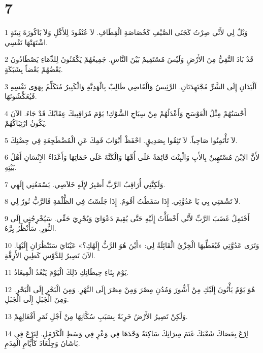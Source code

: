 \chapter{7}

\par 1 وَيْلٌ لِي لأَنِّي صِرْتُ كَجَنَى الصَّيْفِ كَخُصَاصَةِ الْقِطَافِ. لاَ عُنْقُودَ لِلأَكْلِ وَلاَ بَاكُورَةَ تِينَةٍ اشْتَهَتْهَا نَفْسِي.
\par 2 قَدْ بَادَ التَّقِيُّ مِنَ الأَرْضِ وَلَيْسَ مُسْتَقِيمٌ بَيْنَ النَّاسِ. جَمِيعُهُمْ يَكْمُنُونَ لِلدِّمَاءِ يَصْطَادُونَ بَعْضُهُمْ بَعْضاً بِشَبَكَةٍ.
\par 3 اَلْيَدَانِ إِلَى الشَّرِّ مُجْتَهِدَتَانِ. الرَّئِيسُ وَالْقَاضِي طَالِبٌ بِالْهَدِيَّةِ وَالْكَبِيرُ مُتَكَلِّمٌ بِهَوَى نَفْسِهِ فَيُعَكِّشُونَهَا.
\par 4 أَحْسَنُهُمْ مِثْلُ الْعَوْسَجِ وَأَعْدَلُهُمْ مِنْ سِيَاجِ الشَّوْكِ! يَوْمَ مُرَاقِبِيكَ عِقَابُكَ قَدْ جَاءَ. الآنَ يَكُونُ ارْتِبَاكُهُمْ.
\par 5 لاَ تَأْتَمِنُوا صَاحِباً. لاَ تَثِقُوا بِصَدِيقٍ. احْفَظْ أَبْوَابَ فَمِكَ عَنِ الْمُضْطَجِعَةِ فِي حِضْنِكَ.
\par 6 لأَنَّ الاِبْنَ مُسْتَهِينٌ بِالأَبِ وَالْبِنْتَ قَائِمَةٌ عَلَى أُمِّهَا وَالْكَنَّةَ عَلَى حَمَاتِهَا وَأَعْدَاءُ الإِنْسَانِ أَهْلُ بَيْتِهِ.
\par 7 وَلَكِنَّنِي أُرَاقِبُ الرَّبَّ أَصْبِرُ لإِلَهِ خَلاَصِي. يَسْمَعُنِي إِلَهِي.
\par 8 لاَ تَشْمَتِي بِي يَا عَدُوَّتِي. إِذَا سَقَطْتُ أَقُومُ. إِذَا جَلَسْتُ فِي الظُّلْمَةِ فَالرَّبُّ نُورٌ لِي.
\par 9 أَحْتَمِلُ غَضَبَ الرَّبِّ لأَنِّي أَخْطَأْتُ إِلَيْهِ حَتَّى يُقِيمَ دَعْوَايَ وَيُجْرِيَ حَقِّي. سَيُخْرِجُنِي إِلَى النُّورِ. سَأَنْظُرُ بِرَّهُ.
\par 10 وَتَرَى عَدُوَّتِي فَيُغَطِّيهَا الْخِزْيُ الْقَائِلَةُ لِي: «أَيْنَ هُوَ الرَّبُّ إِلَهُكِ؟» عَيْنَايَ سَتَنْظُرَانِ إِلَيْهَا. الآنَ تَصِيرُ لِلدَّوْسِ كَطِينِ الأَزِقَّةِ.
\par 11 يَوْمَ بِنَاءِ حِيطَانِكِ ذَلِكَ الْيَوْمَ يَبْعُدُ الْمِيعَادُ.
\par 12 هُوَ يَوْمٌ يَأْتُونَ إِلَيْكِ مِنْ أَشُّورَ وَمُدُنِ مِصْرَ وَمِنْ مِصْرَ إِلَى النَّهْرِ. وَمِنَ الْبَحْرِ إِلَى الْبَحْرِ. وَمِنَ الْجَبَلِ إِلَى الْجَبَلِ.
\par 13 وَلَكِنْ تَصِيرُ الأَرْضُ خَرِبَةً بِسَبَبِ سُكَّانِهَا مِنْ أَجْلِ ثَمَرِ أَفْعَالِهِمْ.
\par 14 اِرْعَ بِعَصَاكَ شَعْبَكَ غَنَمَ مِيرَاثِكَ سَاكِنَةً وَحْدَهَا فِي وَعْرٍ فِي وَسَطِ الْكَرْمَلِ. لِتَرْعَ فِي بَاشَانَ وَجِلْعَادَ كَأَيَّامِ الْقِدَمِ.
